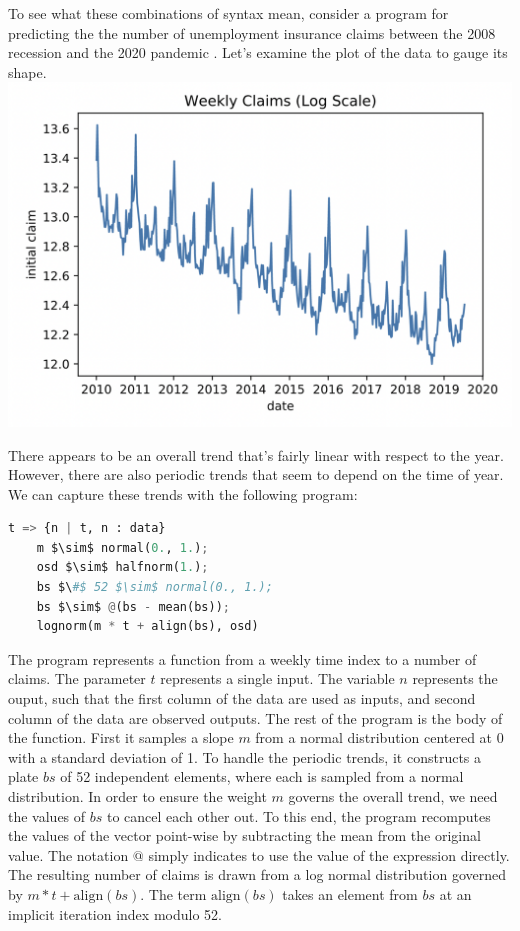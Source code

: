 \documentclass[runningheads]{llncs}
\begin{document}
To see what these combinations of syntax mean, consider a program
for predicting the the number of unemployment insurance claims 
between the 2008 recession and the 2020 pandemic \cite{}.
Let's examine the plot of the data to gauge its shape.
\newline
\includegraphics[scale=0.35]{weekly_claims}

There appears to be an overall trend that's fairly linear with respect to the year. 
However, there are also periodic trends that seem to depend on the time of year.  
We can capture these trends with the following program:

\begin{lstlisting}[language=Python]
t => {n | t, n : data}
    m $\sim$ normal(0., 1.); 
    osd $\sim$ halfnorm(1.); 
    bs $\#$ 52 $\sim$ normal(0., 1.); 
    bs $\sim$ @(bs - mean(bs));
    lognorm(m * t + align(bs), osd)
\end{lstlisting}

The program represents a function from a weekly time index to a number of claims.
The parameter $t$ represents a single input. The variable $n$ represents
the ouput, such that the first column of the data are used as inputs, 
and second column of the data are observed outputs.
The rest of the program is the body of the function.
First it samples a slope $m$ from a normal distribution centered at 0 with 
a standard deviation of 1. To handle the periodic trends, it constructs
a plate $bs$ of 52 independent elements, where each is sampled from 
a normal distribution. In order to ensure the weight $m$ governs
the overall trend, we need the values of $bs$ to cancel each other out.
To this end, the program recomputes the values of the vector point-wise 
by subtracting the mean from the original value. The notation $@$ simply indicates
to use the value of the expression directly.
The resulting number of claims is drawn from a log normal distribution
governed by $m * t + \text{align}(bs)$. The term $\text{align}(bs)$ takes an element from $bs$ 
at an implicit iteration index modulo 52. 
\end{document}
